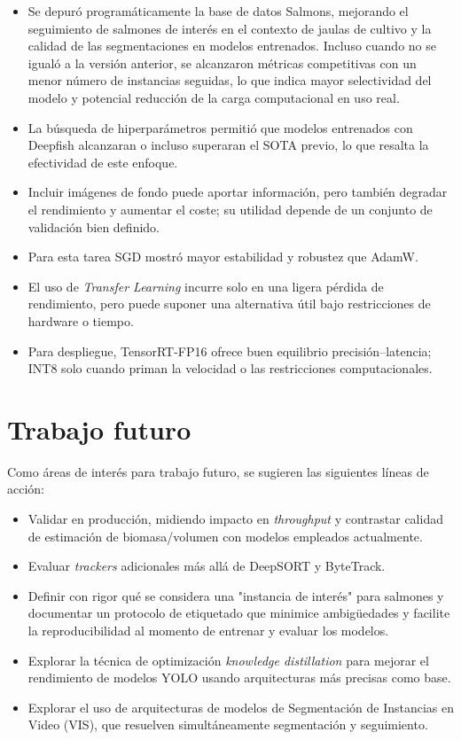 \begin{itemize}
  \setlength{\itemsep}{0pt}%
  \setlength{\parskip}{0pt}%
  \setlength{\parsep}{0pt}%
    \item Se depuró programáticamente la base de datos Salmons, mejorando el seguimiento de salmones de interés en el contexto de jaulas de cultivo y la calidad de las segmentaciones en modelos entrenados. Incluso cuando no se igualó a la versión anterior, se alcanzaron métricas competitivas con un menor número de instancias seguidas, lo que indica mayor selectividad del modelo y potencial reducción de la carga computacional en uso real.
    \item La búsqueda de hiperparámetros permitió que modelos entrenados con Deepfish alcanzaran o incluso superaran el SOTA previo, lo que resalta la efectividad de este enfoque.
    \item Incluir imágenes de fondo puede aportar información, pero también degradar el rendimiento y aumentar el coste; su utilidad depende de un conjunto de validación bien definido.
    \item Para esta tarea SGD mostró mayor estabilidad y robustez que AdamW.
    \item El uso de \textit{Transfer Learning} incurre solo en una ligera pérdida de rendimiento, pero puede suponer una alternativa útil bajo restricciones de hardware o tiempo.
    \item Para despliegue, TensorRT-FP16 ofrece buen equilibrio precisión--latencia; INT8 solo cuando priman la velocidad o las restricciones computacionales.
\end{itemize}

\section{Trabajo futuro}
Como áreas de interés para trabajo futuro, se sugieren las siguientes líneas de acción:
\begin{itemize}
  \setlength{\itemsep}{0pt}%
  \setlength{\parskip}{0pt}%
  \setlength{\parsep}{0pt}%
    \item Validar en producción, midiendo impacto en \textit{throughput} y contrastar calidad de estimación de biomasa/volumen con modelos empleados actualmente.
    \item Evaluar \textit{trackers} adicionales más allá de DeepSORT y ByteTrack.
    \item Definir con rigor qué se considera una "instancia de interés" para salmones y documentar un protocolo de etiquetado que minimice ambigüedades y facilite la reproducibilidad al momento de entrenar y evaluar los modelos.
    \item Explorar la técnica de optimización \textit{knowledge distillation} para mejorar el rendimiento de modelos YOLO usando arquitecturas más precisas como base.
    \item Explorar el uso de arquitecturas de modelos de Segmentación de Instancias en Video (VIS), que resuelven simultáneamente segmentación y seguimiento.
\end{itemize}